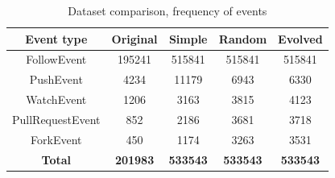 \documentclass[dvipsnames,format=sigconf,anonymous=False,review=false, balance=false]{acmart}
\begin{document}
\begin{table}
\centering
\caption{Dataset comparison, frequency of events}\vspace{-2mm}
\label{table:alldatasets}
\begin{tabular}{ccccc}
  \toprule
  \textbf{Event type} & \textbf{Original} & \textbf{Simple} & \textbf{Random} & \textbf{Evolved}\\
  \midrule
  FollowEvent & 195241 & 515841 & 515841 & 515841 \\
  PushEvent & 4234  & 11179 & 6943 & 6330\\
  WatchEvent & 1206  & 3163 & 3815 & 4123\\
  PullRequestEvent & 852  & 2186 & 3681 & 3718\\
  ForkEvent & 450  & 1174 & 3263 & 3531\\
  \midrule
  \textbf{Total} & \textbf{201983} & \textbf{533543} & \textbf{533543} & \textbf{533543} \\
  \bottomrule
\end{tabular}
\end{table}
\end{document}
